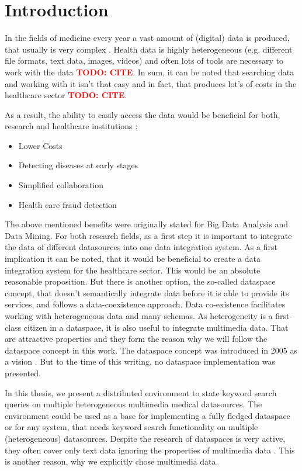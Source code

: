\chapter{Introduction}

In the fields of medicine every year a vast amount of (digital) data is produced, that usually is very complex \cite[p. 1]{ASurveyOnDataMiningApproachesForHealthcare}. Health data is highly heterogeneous (e.g. different file formats, text data, images, videos) and often lots of tools are necessary to work with the data \textbf{\textcolor{red}{TODO: CITE}}. In sum, it can be noted that searching data and working with it isn't that easy and in fact, that produces lot's of costs in the healthcare sector
\textbf{\textcolor{red}{TODO: CITE}}.  

As a result, the ability to easily access the data would be beneficial for both, research and healthcare institutions \cite[p. 2]{Raghupathi2014}:
\begin{itemize}
	\item Lower Costs
	\item Detecting diseases at early stages
	\item Simplified collaboration
	\item Health care fraud detection
\end{itemize}

The above mentioned benefits were originally stated for Big Data Analysis and Data Mining. For both research fields, as a first step it is important to integrate the data of different datasources into one data integration system. As a first implication it can be noted, that it would be beneficial to create a data integration system for the healthcare sector. This would be an absolute reasonable proposition. But there is another option, the so-called dataspace concept, that doesn't semantically integrate data before it is able to provide its services, and follows a data-coexistence approach. Data co-existence facilitates working with heterogeneous data and many schemas. As heterogeneity is a first-class citizen in a dataspace, it is also useful to integrate multimedia data. That are attractive properties and they form the reason why we will follow the dataspace concept in this work.
The dataspace concept was introduced in 2005 as a vision \cite{Franklin:2005:DDN:1107499.1107502}. But to the time of this writing, no dataspace implementation was presented. 

In this thesis, we present a distributed environment to state keyword search queries on multiple heterogeneous multimedia medical datasources. The environment could be used as a base for implementing a fully fledged dataspace or for any system, that needs keyword search functionality on multiple (heterogeneous) datasources. Despite the research of dataspaces is very active, they often cover only text data ignoring the properties of multimedia data \cite{6167826}. This is another reason, why we explicitly chose multimedia data.

